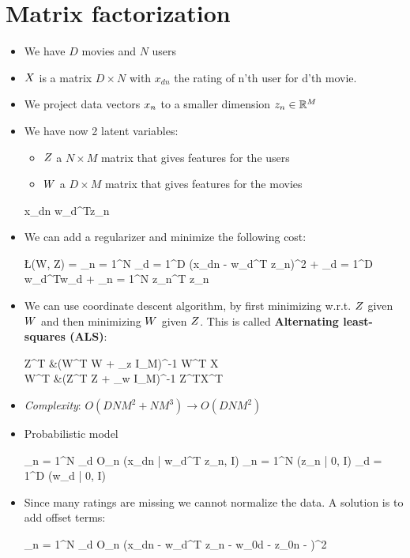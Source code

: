 
\section{Matrix factorization}
\begin{itemize}
	\item We have $D$ movies and $N$ users
	\item $\*X$ is a matrix $D \times N$ with $x_{dn}$ the rating of n'th user for d'th movie.
	\item We project data vectors $\*x_n$ to a smaller dimension $\*z_n \in \Bbb R^M$
	\item We have now 2 latent variables:
	\begin{itemize}
		\item $\*Z$ a $N \times M$ matrix that gives features for the users
	 	\item $\*W$ a $D \times M$ matrix that gives features for the movies
	 \end{itemize} 
	 \begin{myalign*}
	     x_{dn} \approx \*w_d^T\*z_n
	 \end{myalign*}
	 \item We can add a regularizer and minimize the following cost:
	 \begin{myalign*}
	     \L(\*W, \*Z) =  \sum_{n = 1}^N \sum_{d = 1}^D (x_{dn} - \*w_d^T \*z_n)^2 +  \sum_{d = 1}^D \*w_d^T\*w_d +  \sum_{n = 1}^N \*z_n^T \*z_n
	 \end{myalign*}
	 \item We can use coordinate descent algorithm, by first minimizing w.r.t. $\*Z$ given $\*W$ and then minimizing $\*W$ given $\*Z$. This is called \textbf{Alternating least-squares (ALS)}:
	 \begin{myalign*}
	     \*Z^T &\leftarrow (\*W^T \*W + \lambda_z \*I_M)^{-1} \*W^T \*X \\
	     \*W^T &\leftarrow (\*Z^T \*Z + \lambda_w \*I_M)^{-1} \*Z^T\*X^T
	 \end{myalign*}
	 \item \textit{Complexity}: $O(D N M^2 + N M^3) \rightarrow O(D N M^2)$
	 \item Probabilistic model
	 \begin{myalign*}
	     \prod_{n = 1}^N \prod_{d \in O_n} \N(x_{dn} | \*w_d^T \*z_n, I) 
	     \times \prod_{n = 1}^N \N(\*z_n | 0,  I) 
	     \times \prod_{d = 1}^D \N(\*w_d | 0,  I)
	 \end{myalign*}

	 \item Since many ratings are missing we cannot normalize the data. A solution is to add offset terms:
	 \begin{myalign*}
	      \sum_{n = 1}^N \sum_{d \in O_n} (x_{dn} - \*w_d^T \*z_n - w_{0d} - z_{0n} - \mu)^2
	 \end{myalign*}
\end{itemize}

